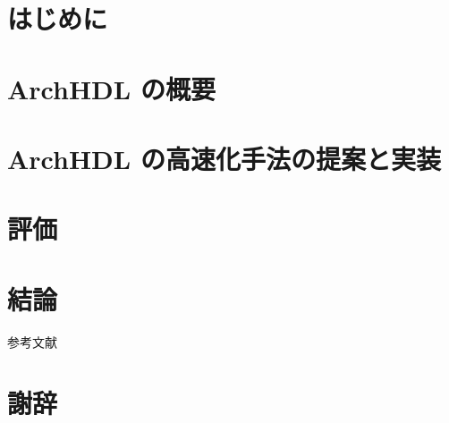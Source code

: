 \begin{abstract}
 
\end{abstract}

\maketitle

\section{はじめに}



\section{ArchHDL の概要} \label{s:summary}



\section{ArchHDL の高速化手法の提案と実装} \label{s:method}



\section{評価} \label{s:evaluation}



\section{結論} \label{s:conclusion}



 参考文献 \fi


\section{謝辞} \label{s:acknowledgment}


